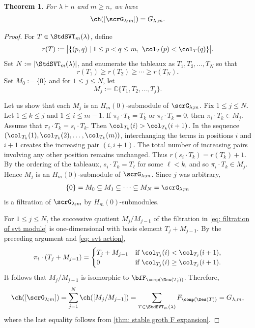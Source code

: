 \documentclass[12pt, reqno]{amsart}
\numberwithin{equation}{section}
\numberwithin{figure}{section}
\numberwithin{table}{section}
\newtheorem{theorem}{Theorem}[section]
\theoremstyle{definition}
\def\C{\mathbb C}
\begin{document}
\begin{theorem}\label{thm: characteristic}
For $\lambda \vdash n$ and $m\ge n$, we have
\[
\ch([\scrG_{\lambda;m}])=G_{\lambda,m}.
\]
\end{theorem}

\begin{proof}
For $T\in\StdSVT_m(\lambda)$, define
\[
r(T):=\bigl|\{(p,q)\mid 1\le p<q\le m,\ \col_T(p)<\col_T(q)\}\bigr|.
\]
Set $N:=|\StdSVT_m(\lambda)|$, and enumerate the tableaux as $T_1,T_2,\ldots,T_N$ so that
\[
r(T_1)\ge r(T_2)\ge\cdots\ge r(T_N).
\]
Set $M_0:=\{0\}$ and for $1\le j\le N$, let
\[
M_j:=\C\{T_1,T_2,\ldots,T_j\}.
\]

Let us show that each $M_j$ is an $H_m(0)$-submodule of $\scrG_{\lambda;m}$.
Fix $1 \le j \le N$.
Let $1\le k\le j$ and $1\le i\le m-1$.
If $\pi_i \cdot T_k = T_k$ or $\pi_i \cdot T_k = 0$, then $\pi_i \cdot T_k \in M_j$.
Assume that $\pi_i \cdot T_k = s_i \cdot T_k$.
Then $\col_{T_k}(i)>\col_{T_k}(i+1)$.
In the sequence $(\col_{T_k}(1),\col_{T_k}(2),\ldots,\col_{T_k}(m))$, interchanging the terms in positions $i$ and $i+1$ creates the increasing pair $(i,i+1)$.
The total number of increasing pairs involving any other position remains unchanged.
Thus $r(s_i\cdot T_k)=r(T_k)+1$.
By the ordering of the tableaux, $s_i\cdot T_k=T_\ell$ for some $\ell<k$, and so $\pi_i\cdot T_k\in M_j$.
Hence $M_j$ is an $H_m(0)$-submodule of $\scrG_{\lambda;m}$.
Since $j$ was arbitrary,
\begin{align}\label{eq: filtration of svt module}
\{0\}=M_0\subseteq M_1\subseteq\cdots\subseteq M_N=\scrG_{\lambda;m}
\end{align}
is a filtration of $\scrG_{\lambda;m}$ by $H_m(0)$-submodules.

For $1\le j\le N$, the successive quotient $M_j/M_{j-1}$ of the filtration in \cref{eq: filtration of svt module} is one-dimensional with basis element $T_j + M_{j-1}$.
By the preceding argument and \cref{eq: svt action},
\[
\pi_i\cdot (T_j+M_{j-1}) =
\begin{cases}
T_j+M_{j-1} & \text{if $\col_{T_j}(i)<\col_{T_j}(i+1)$},\\
0 & \text{if $\col_{T_j}(i)\ge\col_{T_j}(i+1)$}.
\end{cases}
\]
It follows that $M_j/M_{j-1}$ is isomorphic to $\bfF_{\comp(\Des(T_j))}$.
Therefore,
\[
\ch([\scrG_{\lambda;m}])
=\sum_{j=1}^N\ch([M_j/M_{j-1}])
=\sum_{T\in\StdSVT_m(\lambda)}F_{\comp(\Des(T))} = G_{\lambda,m},
\]
where the last equality follows from \cref{thm: stable groth F expansion}.
\end{proof}
\end{document}
